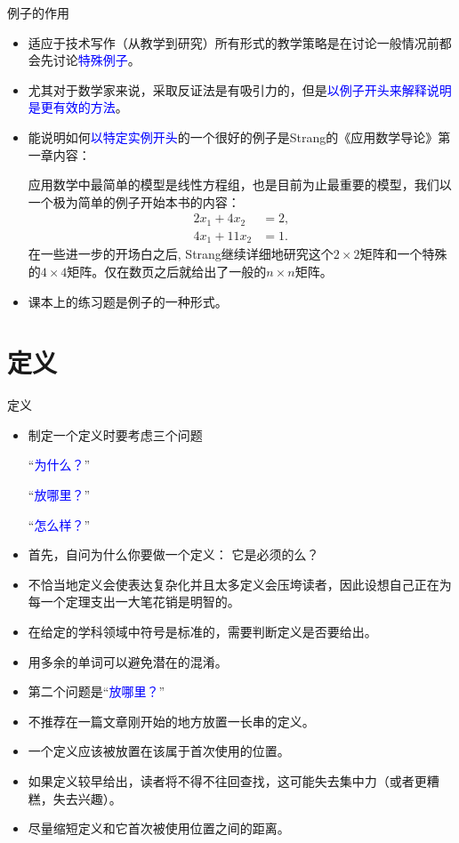 \documentclass[13pt]{ctexbeamer}
\newcommand{\blue}[1]{\textcolor{blue}{#1}}
\begin{document}
\begin{frame}{例子的作用}
\begin{itemize}
	\item 
适应于技术写作（从教学到研究）所有形式的教学策略是在讨论一般情况前都会先讨论\blue{特殊例子}。
\item 
尤其对于数学家来说，采取反证法是有吸引力的，但是\blue{以例子开头来解释说明是更有效的方法}。
\item 
能说明如何\blue{以特定实例开头}的一个很好的例子是Strang的《应用数学导论》第一章内容：

{\small
应用数学中最简单的模型是线性方程组，也是目前为止最重要的模型，我们以一个极为简单的例子开始本书的内容：
\begin{align*}
	2 x_1+ 4 x_2& =2,\\
	4 x_1 +11x_2 & =1.
\end{align*}
在一些进一步的开场白之后, Strang继续详细地研究这个$2\times 2$矩阵和一个特殊的$4\times 4$矩阵。仅在数页之后就给出了一般的$n \times n$矩阵。}

\item 课本上的\alert{练习题}是例子的一种形式。
\end{itemize}


\end{frame}


\section{定义}
\begin{frame}{定义}
\begin{itemize}
\item 
制定一个定义时要考虑三个问题

``\blue{为什么？}'' 

``\blue{放哪里？}'' 

``\blue{怎么样？}'' 
\item 
首先，自问为什么你要做一个定义： 它是必须的么？
\item 
不恰当地定义会使表达复杂化并且太多定义会压垮读者，因此设想自己正在为每一个定理支出一大笔花销是明智的。
\item 
在给定的学科领域中符号是标准的，需要判断定义是否要给出。
\item 
用多余的单词可以避免潜在的混淆。
\end{itemize}
\end{frame}


\begin{frame}
\begin{itemize}
	\item  第二个问题是``\blue{放哪里？}'' 
	\item 不推荐在一篇文章刚开始的地方放置一长串的定义。
	\item  一个定义应该被放置在该属于首次使用的位置。
	\item 如果定义较早给出，读者将不得不往回查找，这可能失去集中力（或者更糟糕，失去兴趣）。
	\item 尽量缩短定义和它首次被使用位置之间的距离。
\end{itemize}
\end{frame}
\end{document}
